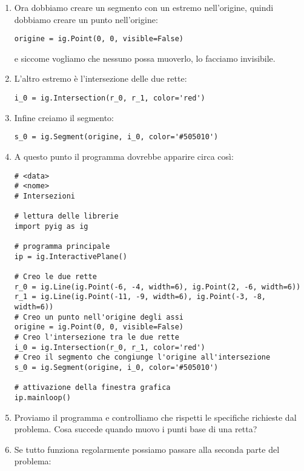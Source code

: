 \begin{enumerate} [noitemsep]
Eseguiamo il programma controllando che rispetti le specifiche.

\item Ora dobbiamo creare un segmento con un estremo nell'origine, quindi 
dobbiamo creare un punto nell'origine:

\begin{lstlisting}
origine = ig.Point(0, 0, visible=False)
\end{lstlisting}

e siccome vogliamo che nessuno possa muoverlo, lo facciamo invisibile.

\item L'altro estremo è l'intersezione delle due rette:

\begin{lstlisting}
i_0 = ig.Intersection(r_0, r_1, color='red')
\end{lstlisting}

\item Infine creiamo il segmento:

\begin{lstlisting}
s_0 = ig.Segment(origine, i_0, color='#505010')
\end{lstlisting}

\item A questo punto il programma dovrebbe apparire circa così:

\begin{lstlisting}
# <data>
# <nome>
# Intersezioni

# lettura delle librerie
import pyig as ig

# programma principale
ip = ig.InteractivePlane()

# Creo le due rette
r_0 = ig.Line(ig.Point(-6, -4, width=6), ig.Point(2, -6, width=6))
r_1 = ig.Line(ig.Point(-11, -9, width=6), ig.Point(-3, -8, width=6))
# Creo un punto nell'origine degli assi
origine = ig.Point(0, 0, visible=False)
# Creo l'intersezione tra le due rette
i_0 = ig.Intersection(r_0, r_1, color='red')
# Creo il segmento che congiunge l'origine all'intersezione
s_0 = ig.Segment(origine, i_0, color='#505010')

# attivazione della finestra grafica
ip.mainloop()
\end{lstlisting}

\item Proviamo il programma e controlliamo che rispetti le specifiche richieste
dal problema. Cosa succede quando muovo i punti base di una retta?

\item Se tutto funziona regolarmente possiamo passare alla seconda parte
del problema:


\end{enumerate}
